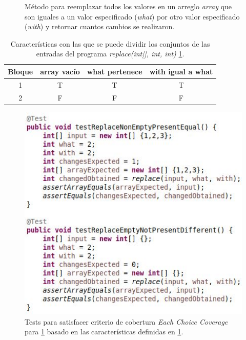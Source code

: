 \begin{figure}
	
	\caption{M\'etodo para reemplazar todos los valores en un arreglo \emph{array} que son iguales a un valor especificado (\emph{what}) por otro valor especificado (\emph{with}) y retornar cuantos cambios se realizaron.}
	\label{figures.code.replaceExample}
\end{figure}

\begin{table}[]
	\begin{tabular}{|c|ccc|}
		\hline
		Bloque & array vacío & what pertenece & with igual a what \\ \hline
		1 & T & T & T \\ \hline
		2 & F & F & F \\ \hline
	\end{tabular}
	\caption{Caracter\'isticas con las que se puede dividir los conjuntos de las entradas del programa \emph{replace(int[], int, int)} \ref{figures.code.replaceExample}.}
	\label{tables.example.codeCoverage}
\end{table}

\begin{figure}
	\includegraphics[width=\linewidth]{figures/replaceTestsEachChoice.JPG}
	\caption{Tests para satisfacer criterio de cobertura \emph{Each Choice Coverage} para \ref{figures.code.replaceExample} basado en las caracter\'isticas definidas en \ref{tables.example.codeCoverage}.}
	\label{figures.examples.coverage.eccTests}
\end{figure}


